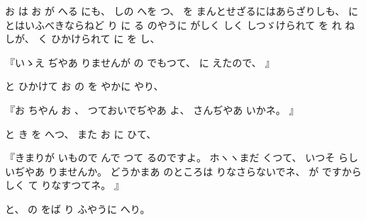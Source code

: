 
%
お
は
お
が
へる
にも、
%
しの
へを
つ、
%
を
まんとせざるにはあらざりしも、
%
に
とはいふべきならねど
り
に
る
のやうに
がしく
しく
しつゞけられて
を
れ
ね
しが、
%
く
ひかけられて
に
を
し、

%
『いゝえ
ぢやあ
りませんが
の
でもつて、
%
に
えたので、
』

%
と
ひかけて
お
の
を
やかに
やり、

%
『お
ちやん
お
、
%
つておいでぢやあ
よ、
%
さんぢやあ
いかネ。
』

%
と
き
を
へつ、
%
また
お
に
ひて、

%
『きまりが
いもので
んで
つて
るのですよ。
%
ホヽヽまだ
くつて、
%
いつそ
らしいぢやあ
りませんか。
%
どうかまあ
のところは
りなさらないでネ、
%
が
ですから
しく
て
りなすつてネ。
』

%
と、
%
の
をば
り
ふやうに
へり。

